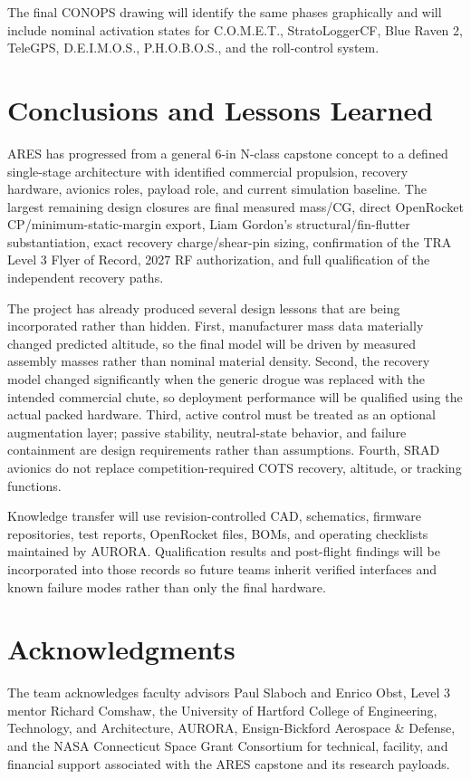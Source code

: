 \documentclass[10pt]{article}
\newcommand{\COMET}{C.O.M.E.T.}
\newcommand{\DEIMOS}{D.E.I.M.O.S.}
\newcommand{\PHOBOS}{P.H.O.B.O.S.}
\begin{document}
The final CONOPS drawing will identify the same phases graphically and will include nominal activation states for \COMET{}, StratoLoggerCF, Blue Raven 2, TeleGPS, \DEIMOS{}, \PHOBOS{}, and the roll-control system.

\section{Conclusions and Lessons Learned}
ARES has progressed from a general 6-in N-class capstone concept to a defined single-stage architecture with identified commercial propulsion, recovery hardware, avionics roles, payload role, and current simulation baseline. The largest remaining design closures are final measured mass/CG, direct OpenRocket CP/minimum-static-margin export, Liam Gordon's structural/fin-flutter substantiation, exact recovery charge/shear-pin sizing, confirmation of the TRA Level 3 Flyer of Record, 2027 RF authorization, and full qualification of the independent recovery paths.

The project has already produced several design lessons that are being incorporated rather than hidden. First, manufacturer mass data materially changed predicted altitude, so the final model will be driven by measured assembly masses rather than nominal material density. Second, the recovery model changed significantly when the generic drogue was replaced with the intended commercial chute, so deployment performance will be qualified using the actual packed hardware. Third, active control must be treated as an optional augmentation layer; passive stability, neutral-state behavior, and failure containment are design requirements rather than assumptions. Fourth, SRAD avionics do not replace competition-required COTS recovery, altitude, or tracking functions.

Knowledge transfer will use revision-controlled CAD, schematics, firmware repositories, test reports, OpenRocket files, BOMs, and operating checklists maintained by AURORA. Qualification results and post-flight findings will be incorporated into those records so future teams inherit verified interfaces and known failure modes rather than only the final hardware.

\section*{Acknowledgments}
The team acknowledges faculty advisors Paul Slaboch and Enrico Obst, Level 3 mentor Richard Comshaw, the University of Hartford College of Engineering, Technology, and Architecture, AURORA, Ensign-Bickford Aerospace \& Defense, and the NASA Connecticut Space Grant Consortium for technical, facility, and financial support associated with the ARES capstone and its research payloads.
\end{document}
